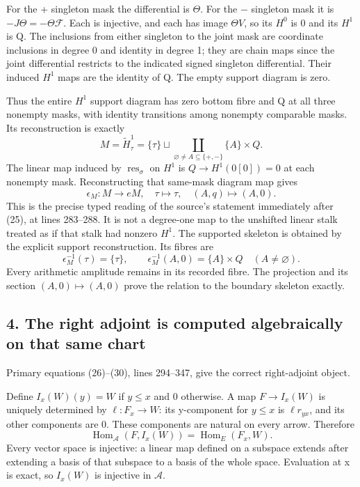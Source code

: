 \documentclass[10pt,a4paper,oneside]{report}
\begin{document}
For the + singleton mask the differential is \(\Theta\). For the \(-\) singleton mask it is \(-J\Theta=-\Theta\mathcal F\). Each is injective, and each has image \(\Theta V\), so its \(H^0\) is 0 and its \(H^1\) is Q. The inclusions from either singleton to the joint mask are coordinate inclusions in degree 0 and identity in degree 1; they are chain maps since the joint differential restricts to the indicated signed singleton differential. Their induced \(H^1\) maps are the identity of Q. The empty support diagram is zero.

Thus the entire \(H^1\) support diagram has zero bottom fibre and Q at all three nonempty masks, with identity transitions among nonempty comparable masks. Its reconstruction is exactly \[
M=\widetilde H^1_\tau
=\{\tau\}\sqcup\coprod_{\varnothing\ne A\subseteq\{+,-\}}\{A\}\times Q.
\] The linear map induced by \(\operatorname{res}_\sigma\) on \(H^1\) is \(Q\to H^1(0[0])=0\) at each nonempty mask. Reconstructing that same-mask diagram map gives \[
\epsilon_M:M\longrightarrow eM,
\quad\tau\longmapsto\tau,\quad(A,q)\longmapsto(A,0).
\] This is the precise typed reading of the source's statement immediately after (25), at lines 283--288. It is not a degree-one map to the unshifted linear stalk treated as if that stalk had nonzero \(H^1\). The supported skeleton is obtained by the explicit support reconstruction. Its fibres are \[
\epsilon_M^{-1}(\tau)=\{\tau\},\qquad
\epsilon_M^{-1}(A,0)=\{A\}\times Q\quad(A\ne\varnothing).
\] Every arithmetic amplitude remains in its recorded fibre. The projection and its section \((A,0)\mapsto(A,0)\) prove the relation to the boundary skeleton exactly.

\subsection{4. The right adjoint is computed algebraically on that same chart}\label{proof01:source-maps-the-right-adjoint-is-computed-algebraically-on-that-same-chart}

Primary equations (26)--(30), lines 294--347, give the correct right-adjoint object.

Define \(I_x(W)(y)=W\) if \(y\leq x\) and 0 otherwise. A map \(F\to I_x(W)\) is uniquely determined by \(\ell:F_x\to W\): its y-component for \(y\leq x\) is \(\ell r_{yx}\), and its other components are 0. These components are natural on every arrow. Therefore \[
\operatorname{Hom}_{\mathcal A}(F,I_x(W))=\operatorname{Hom}_E(F_x,W).
\] Every vector space is injective: a linear map defined on a subspace extends after extending a basis of that subspace to a basis of the whole space. Evaluation at x is exact, so \(I_x(W)\) is injective in \(\mathcal A\).
\end{document}
